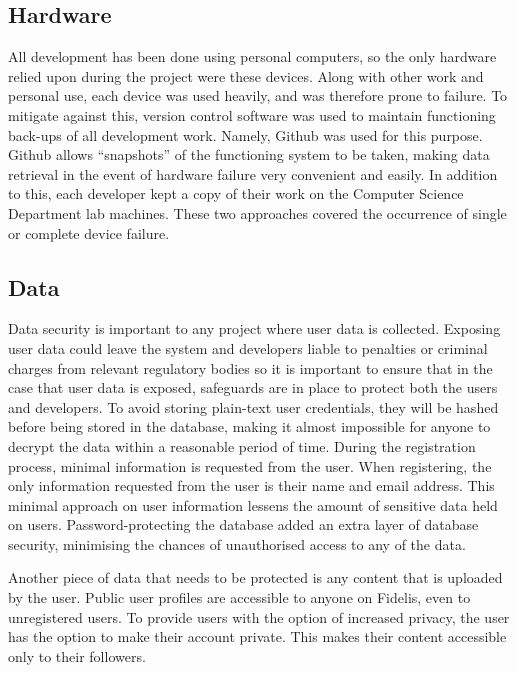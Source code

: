 \subsection{Hardware}
All development has been done using personal computers, so the only hardware relied upon during the project were these devices. Along with other work and personal use, each device was used heavily, and was therefore prone to failure. To mitigate against this, version control software was used to maintain functioning back-ups of all development work. Namely, Github was used for this purpose. Github allows ``snapshots'' of the functioning system to be taken, making data retrieval in the event of hardware failure very convenient and easily. In addition to this, each developer kept a copy of their work on the Computer Science Department lab machines. These two approaches covered the occurrence of single or complete device failure.

\subsection{Data}
Data security is important to any project where user data is collected. Exposing user data could leave the system and developers liable to penalties or criminal charges from relevant regulatory bodies so it is important to ensure that in the case that user data is exposed, safeguards are in place to protect both the users and developers. To avoid storing plain-text user credentials, they will be hashed before being stored in the database, making it almost impossible for anyone to decrypt the data within a reasonable period of time. During the registration process, minimal information is requested from the user. When registering, the only information requested from the user is their name and email address. This minimal approach on user information lessens the amount of sensitive data held on users. Password-protecting the database added an extra layer of database security, minimising the chances of unauthorised access to any of the data.

Another piece of data that needs to be protected is any content that is uploaded by the
user. Public user profiles are accessible to anyone on Fidelis, even to unregistered users. To provide users with the option of increased privacy, the user has the option to make their account private. This makes their content accessible only to their followers.

